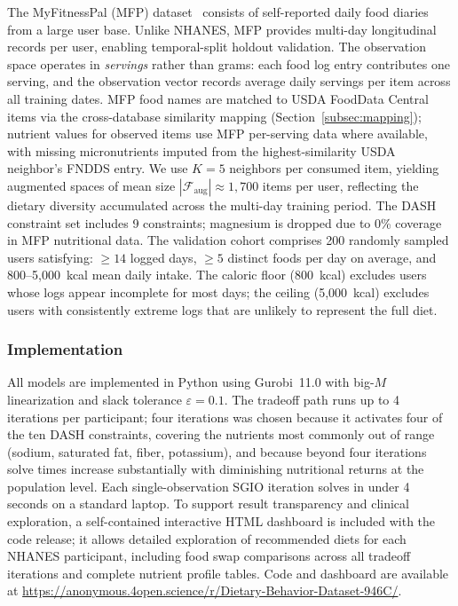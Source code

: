 \documentclass[journal]{IEEEtran}
\newcommand{\Faug}{\mathcal{F}_{\mathrm{aug}}}
\begin{document}
The MyFitnessPal (MFP) dataset~\cite{mfp_kaggle} consists of
self-reported daily food diaries from a large user base. Unlike NHANES,
MFP provides multi-day longitudinal records per user, enabling
temporal-split holdout validation. The observation space operates in
\emph{servings} rather than grams: each food log entry contributes one
serving, and the observation vector records average daily servings per
item across all training dates. MFP food names are matched to USDA
FoodData Central items via the cross-database similarity mapping
(Section~\ref{subsec:mapping}); nutrient values for observed items use
MFP per-serving data where available, with missing micronutrients imputed
from the highest-similarity USDA neighbor's FNDDS entry. We use $K{=}5$ neighbors per
consumed item, yielding augmented spaces of mean size $|\Faug| \approx
1{,}700$ items per user, reflecting the dietary diversity accumulated
across the multi-day training period. The DASH constraint set includes 9
constraints; magnesium is dropped due to 0\% coverage in MFP nutritional
data. The validation cohort comprises 200 randomly sampled users
satisfying: $\geq 14$ logged days, $\geq 5$ distinct foods per day on
average, and 800--5,000~kcal mean daily intake. The caloric floor
(800~kcal) excludes users whose logs appear incomplete for most days;
the ceiling (5,000~kcal) excludes users with consistently extreme logs
that are unlikely to represent the full diet.

\subsubsection{Implementation}

All models are implemented in Python using Gurobi~11.0 with big-$M$
linearization and slack tolerance $\varepsilon = 0.1$. The tradeoff path runs up to 4 iterations per participant; four
iterations was chosen because it activates four of the ten DASH
constraints, covering the nutrients most commonly out of range (sodium,
saturated fat, fiber, potassium), and because beyond four iterations
solve times increase substantially with diminishing nutritional returns
at the population level. Each single-observation SGIO
iteration solves in under 4 seconds on a standard laptop. To support
result transparency and clinical exploration, a self-contained
interactive HTML dashboard is included with the code release; it allows
detailed exploration of recommended diets for each NHANES participant,
including food swap comparisons across all tradeoff iterations and
complete nutrient profile tables. Code and dashboard are available at
\url{https://anonymous.4open.science/r/Dietary-Behavior-Dataset-946C/}.
\end{document}
